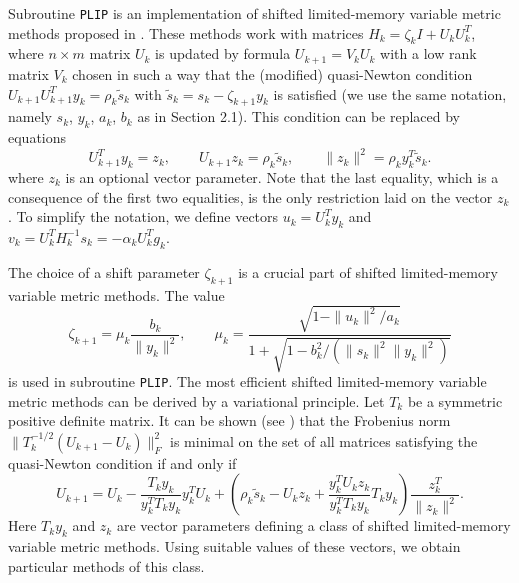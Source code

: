 \documentclass{esub2acm}
\newcommand{\bd}{\begin{displaymath}}
\newcommand{\ed}{\end{displaymath}}
\begin{document}
\vspace{3mm}

\noindent Subroutine {\tt PLIP} is an implementation of shifted
limited-memory variable metric methods proposed in \cite{vll1}.
These methods work with matrices $H_k = \zeta_k I + U_k
U_k^T$, where $n \times m$ matrix $U_k$ is updated by formula
$U_{k+1} = V_k U_k$ with a low rank matrix $V_k$ chosen in  such a
way that the (modified) quasi-Newton condition $U_{k+1} U_{k+1}^T
y_k = \rho_k \tilde{s}_k$ with $\tilde{s}_k=s_k-\zeta_{k+1} y_k$ is
satisfied (we use the same notation, namely $s_k$, $y_k$, $a_k$,
$b_k$ as in Section 2.1). This condition can be replaced by
equations
%
\bd
\label{25}
U_{k+1}^T y_k = z_k, \qquad U_{k+1} z_k = \rho_k \tilde s_k, \qquad
\|z_k\|^2 = \rho_k y_k^T \tilde{s}_k.
\ed
%
where $z_k$ is an optional vector parameter. Note that the last equality,
which is a consequence of the first two equalities, is the only restriction
laid on the vector $z_k$. To simplify the notation, we define vectors
$u_k = U_k^T y_k$ and $v_k = U_k^T H_k^{-1} s_k = -\alpha_k U_k^T g_k$.

The choice of a shift parameter $\zeta_{k+1}$ is a crucial part of shifted
limited-memory variable metric methods. The value
%
\bd
\label{26}
\zeta_{k+1} = \mu_k \frac{b_k}{\|y_k\|^2}, \qquad
\mu_k = \frac{\sqrt{1 - \|u_k\|^2 / a_k}}
{1 + \sqrt{1 - b_k^2/(\|s_k\|^2 \|y_k\|^2)}}
\ed
%
is used in subroutine {\tt PLIP}. The most efficient shifted limited-memory variable
metric methods can be derived by a variational principle. Let $T_k$ be a symmetric
positive definite matrix. It can be shown (see \cite{vll1}) that the Frobenius norm
$\|T_k^{-1/2}(U_{k+1} - U_k)\|_F^2$ is minimal on the set of all matrices satisfying
the quasi-Newton condition if and only if
%
\bd
\label{27}
U_{k+1} = U_k - \frac{T_k y_k}{y_k^T T_k y_k}y_k^T U_k +
\left(\rho_k \tilde{s}_k - U_k z_k + \frac{y_k^T U_k z_k}{y_k^T T_k y_k}T_k y_k\right)
\frac{z_k^T}{\|z_k\|^2}.
\ed
%
Here $T_ky_k$ and $z_k$ are vector parameters defining a class of shifted
limited-memory variable metric methods. Using suitable values of these
vectors, we obtain particular methods of this class.
\end{document}
